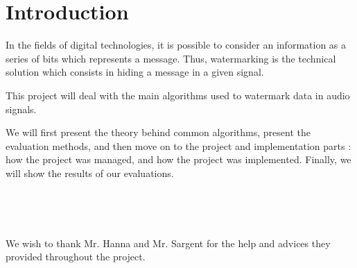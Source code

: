 \chapter*{Introduction}
In the fields of digital technologies, it is possible to consider an information as a series of bits which represents a message. Thus, watermarking is the technical solution which consists in hiding a message in a given signal. 

This project will deal with the main algorithms used to watermark data in audio signals.

We will first present the theory behind common algorithms, present the evaluation methods, and then move on to the project and implementation parts : how the project was managed, and how the project was implemented.
Finally, we will show the results of our evaluations.

~

~

We wish to thank Mr. Hanna and Mr. Sargent for the help and advices they provided throughout the project.